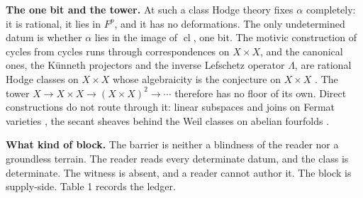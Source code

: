 \documentclass[10pt,twocolumn]{article}
\begin{document}
\textbf{The one bit and the tower.} At such a class Hodge theory fixes
\(\alpha\) completely: it is rational, it lies in \(F^p\), and it has no
deformations. The only undetermined datum is whether \(\alpha\) lies in
the image of \(\operatorname{cl}\), one bit. The motivic construction of
cycles from cycles runs through correspondences on \(X\times X\), and
the canonical ones, the Künneth projectors and the inverse Lefschetz
operator \(\Lambda\), are rational Hodge classes on \(X\times X\) whose
algebraicity is the conjecture on \(X\times X\) \cite{kleiman1968}. The
tower \(X\to X\times X\to (X\times X)^2\to\cdots\) therefore has no
floor of its own. Direct constructions do not route through it: linear
subspaces and joins on Fermat varieties \cite{shioda1979,sk1979}, the
secant sheaves behind the Weil classes on abelian fourfolds
\cite{markman2025b}.

\textbf{What kind of block.} The barrier is neither a blindness of the
reader nor a groundless terrain. The reader reads every determinate
datum, and the class is determinate. The witness is absent, and a reader
cannot author it. The block is supply-side. Table 1 records the ledger.
\end{document}
